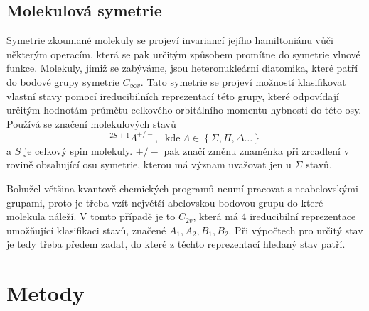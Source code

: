 \subsection{Molekulová symetrie}
Symetrie zkoumané molekuly se projeví invariancí jejího hamiltoniánu vůči některým operacím, která se pak určitým 
způsobem promítne do symetrie vlnové funkce.
Molekuly, jimiž se zabýváme, jsou heteronukleární diatomika, které patří do bodové grupy 
symetrie $C_{\infty v}$. Tato symetrie se projeví možností klasifikovat vlastní stavy 
pomocí ireducibilních reprezentací této grupy, které odpovídají určitým hodnotám 
průmětu celkového orbitálního momentu hybnosti do této osy. Používá se značení molekulových stavů
\begin{equation}
^{2S+1}\Lambda^{+/-},\;\;\mathrm{kde }\;\Lambda\in\left\lbrace \Sigma, \Pi,\Delta \dots 
\right\rbrace
\end{equation}
a $S$ je celkový spin molekuly. $+/-$ pak značí změnu znaménka při zrcadlení v rovině 
obsahující osu symetrie, kterou má význam uvažovat jen u $\Sigma$ stavů.

Bohužel většina kvantově-chemických programů neumí pracovat s neabelovskými grupami, 
proto je třeba vzít největší abelovskou bodovou grupu do které molekula náleží. V 
tomto 
případě je to $C_{2v}$, která má 4 ireducibilní reprezentace umožňující klasifikaci 
stavů, značené $A_1, A_2, B_1, B_2$. Při výpočtech pro určitý stav je tedy třeba 
předem zadat, do které z těchto reprezentací hledaný stav patří.
\section{Metody}
